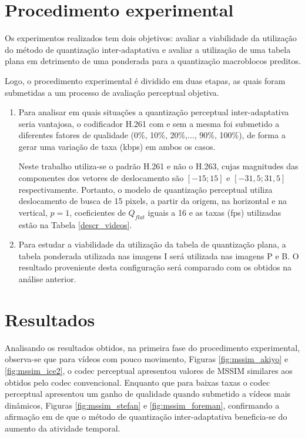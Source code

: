 \section{Procedimento experimental}
\label{proc_experimental}

Os experimentos realizados tem dois objetivos: avaliar a viabilidade da utilização do método de quantização inter-adaptativa e avaliar a utilização de uma tabela plana em detrimento de uma ponderada para a quantização macroblocos preditos. 

Logo, o procedimento experimental é dividido em duas etapas, as quais foram submetidas a um processo de avaliação perceptual objetiva.

\begin{enumerate}
\item Para analisar em quais situações a quantização perceptual inter-adaptativa seria vantajosa, o codificador H.261 com e sem a mesma foi submetido a diferentes fatores de qualidade (0\%, 10\%, 20\%,..., 90\%, 100\%), de forma a gerar uma variação de taxa (kbps) em ambos os casos.

Neste trabalho utiliza-se o padrão H.261 e não o H.263, cujas magnitudes das componentes dos vetores de deslocamento são $ [-15; 15] $ e $ [-31,5; 31,5] $ respectivamente. Portanto, o modelo de quantização perceptual  utiliza deslocamento de busca de 15 pixels, a partir da origem, na horizontal e na vertical, $ p = 1 $, coeficientes de $ Q_{flat} $ iguais a 16 e as taxas (fps) utilizadas estão na Tabela \ref{descr_videos}.

\item Para estudar a viabilidade da utilização da tabela de quantização plana, a tabela ponderada utilizada nas imagens I será utilizada nas imagens P e B. O resultado proveniente desta configuração será comparado com os obtidos na análise anterior.
\end{enumerate}


\section{Resultados}
\label{resultados}

Analisando os resultados obtidos, na primeira fase do procedimento experimental, observa-se que para vídeos com pouco movimento, Figuras \ref{fig:mssim_akiyo} e \ref{fig:mssim_ice2}, o codec perceptual apresentou valores de MSSIM similares aos obtidos pelo codec convencional. Enquanto que para baixas taxas o codec perceptual apresentou um ganho de qualidade quando submetido a vídeos mais dinâmicos, Figuras \ref{fig:mssim_stefan} e \ref{fig:mssim_foreman}, confirmando a afirmação em \cite{Li_humanvisual} de que o método de quantização inter-adaptativa beneficia-se do aumento da atividade temporal.


